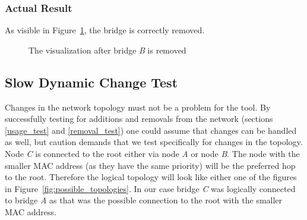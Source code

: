 \subsubsection*{Actual Result}
As visible in Figure~\ref{fig:removal}, the bridge is correctly removed.
\begin{figure}[h]
    \centering
    \caption{The visualization after bridge \textit{B} is removed}
    \label{fig:removal}
\end{figure}

\subsection*{Slow Dynamic Change Test}
\label{slow_dynamic_test}
Changes in the network topology must not be a problem for the tool.
By successfully testing for additions and removals from the network (sections \ref{usage_test} and \ref{removal_test}) one could assume that changes can be handled as well, but caution demands that we test specifically for changes in the topology.
Node \textit{C} is connected to the root either via node \textit{A} or node \textit{B}.
The node with the smaller MAC address (as they have the same priority) will be the preferred hop to the root.
Therefore the logical topology will look like either one of the figures in Figure~\ref{fig:possible_topologies}.
In our case bridge \textit{C} was logically connected to bridge \textit{A} as that was the possible connection to the root with the smaller MAC address.

